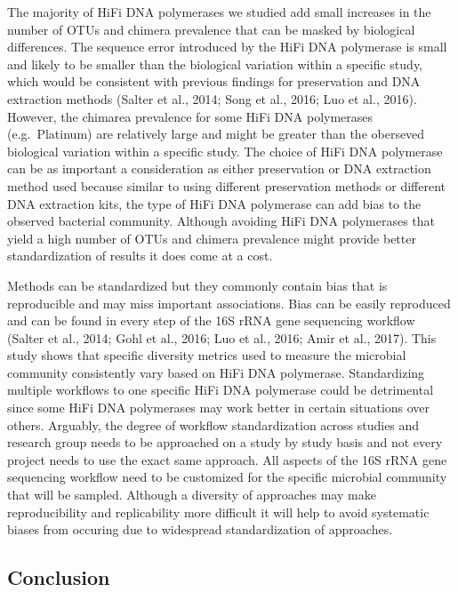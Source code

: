 \documentclass[12pt,]{article}
\begin{document}
The majority of HiFi DNA polymerases we studied add small increases in
the number of OTUs and chimera prevalence that can be masked by
biological differences. The sequence error introduced by the HiFi DNA
polymerase is small and likely to be smaller than the biological
variation within a specific study, which would be consistent with
previous findings for preservation and DNA extraction methods (Salter et
al., 2014; Song et al., 2016; Luo et al., 2016). However, the chimarea
prevalence for some HiFi DNA polymerases (e.g.~Platinum) are relatively
large and might be greater than the oberseved biological variation
within a specific study. The choice of HiFi DNA polymerase can be as
important a consideration as either preservation or DNA extraction
method used because similar to using different preservation methods or
different DNA extraction kits, the type of HiFi DNA polymerase can add
bias to the observed bacterial community. Although avoiding HiFi DNA
polymerases that yield a high number of OTUs and chimera prevalence
might provide better standardization of results it does come at a cost.

Methods can be standardized but they commonly contain bias that is
reproducible and may miss important associations. Bias can be easily
reproduced and can be found in every step of the 16S rRNA gene
sequencing workflow (Salter et al., 2014; Gohl et al., 2016; Luo et al.,
2016; Amir et al., 2017). This study shows that specific diversity
metrics used to measure the microbial community consistently vary based
on HiFi DNA polymerase. Standardizing multiple workflows to one specific
HiFi DNA polymerase could be detrimental since some HiFi DNA polymerases
may work better in certain situations over others. Arguably, the degree
of workflow standardization across studies and research group needs to
be approached on a study by study basis and not every project needs to
use the exact same approach. All aspects of the 16S rRNA gene sequencing
workflow need to be customized for the specific microbial community that
will be sampled. Although a diversity of approaches may make
reproducibility and replicability more difficult it will help to avoid
systematic biases from occuring due to widespread standardization of
approaches.

\newpage

\subsection{Conclusion}\label{conclusion}
\end{document}
